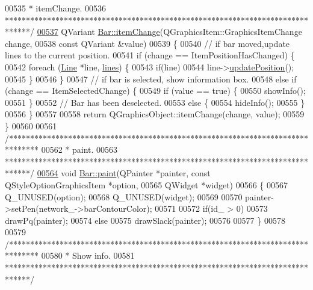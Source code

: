 \begin{DoxyCode}
00535 \textcolor{comment}{ * itemChange.}
00536 \textcolor{comment}{ ******************************************************************************/}
\hypertarget{bar_8cpp_source_l00537}{}\hyperlink{group___models_gad97a82d618ee0c51a9a36e44339c69e6}{00537} QVariant \hyperlink{group___models_gad97a82d618ee0c51a9a36e44339c69e6}{Bar::itemChange}(QGraphicsItem::GraphicsItemChange change,
00538                          \textcolor{keyword}{const} QVariant &value)
00539 \{
00540   \textcolor{comment}{// if bar moved,update lines to the current position.}
00541   \textcolor{keywordflow}{if} (change == ItemPositionHasChanged) \{
00542     \textcolor{keywordflow}{foreach} (\hyperlink{class_line}{Line} *line, \hyperlink{class_bar_a5aabf1f4ac22e20e9cb702a3a7e08eea}{lines}) \{
00543       \textcolor{keywordflow}{if}(line)
00544         line->\hyperlink{group___models_ga8fdb12651d4bc592616d241386b066b3}{updatePosition}();
00545     \}
00546   \}
00547   \textcolor{comment}{// if bar is selected, show information box.}
00548   \textcolor{keywordflow}{else} \textcolor{keywordflow}{if} (change == ItemSelectedChange) \{
00549     \textcolor{keywordflow}{if} (value == \textcolor{keyword}{true}) \{
00550       showInfo();
00551     \}
00552     \textcolor{comment}{// Bar has been deselected.}
00553     \textcolor{keywordflow}{else} \{
00554       hideInfo();
00555     \}
00556   \}
00557 
00558   \textcolor{keywordflow}{return} QGraphicsObject::itemChange(change, value);
00559 \}
00560 
00561 \textcolor{comment}{/*******************************************************************************}
00562 \textcolor{comment}{ * paint.}
00563 \textcolor{comment}{ ******************************************************************************/}
\hypertarget{bar_8cpp_source_l00564}{}\hyperlink{group___models_gacbb6dbac607412c9c1f9dfcd0cd4d432}{00564} \textcolor{keywordtype}{void} \hyperlink{group___models_gacbb6dbac607412c9c1f9dfcd0cd4d432}{Bar::paint}(QPainter *painter, \textcolor{keyword}{const} QStyleOptionGraphicsItem *option,
00565                 QWidget *widget)
00566 \{
00567   Q\_UNUSED(option);
00568   Q\_UNUSED(widget);
00569 
00570   painter->setPen(network\_->barContourColor);
00571 
00572   \textcolor{keywordflow}{if}(id\_ > 0)
00573     drawPq(painter);
00574   \textcolor{keywordflow}{else}
00575     drawSlack(painter);
00576 
00577 \}
00578 
00579 \textcolor{comment}{/*******************************************************************************}
00580 \textcolor{comment}{ * Show info.}
00581 \textcolor{comment}{ ******************************************************************************/}

\end{DoxyCode}
